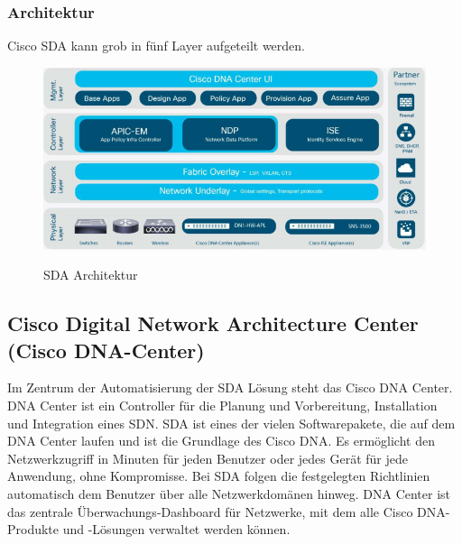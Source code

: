 \subsubsection{Architektur}
Cisco SDA kann grob in fünf Layer aufgeteilt werden.
\begin{figure}[H]
	\centering
	\includegraphics[width=1\linewidth]{img/cisco-sda-architecture.png}\\[1px]
	\caption{SDA Architektur \cite{sda-whitepaper}}
	\label{fig:SDA Architektur}
\end{figure}


\subsection{Cisco Digital Network Architecture Center (Cisco DNA-Center)}
Im Zentrum der Automatisierung der SDA Lösung steht das Cisco DNA Center. DNA Center ist ein Controller für die Planung und Vorbereitung, Installation und Integration eines SDN. SDA ist eines der vielen Softwarepakete, die auf dem DNA Center laufen und ist die Grundlage des Cisco DNA. Es ermöglicht den Netzwerkzugriff in Minuten für jeden Benutzer oder jedes Gerät für jede Anwendung, ohne Kompromisse. Bei SDA folgen die festgelegten Richtlinien automatisch dem Benutzer über alle Netzwerkdomänen hinweg.
DNA Center ist das zentrale Überwachungs-Dashboard für Netzwerke, mit dem alle Cisco DNA-Produkte und -Lösungen verwaltet werden können.

